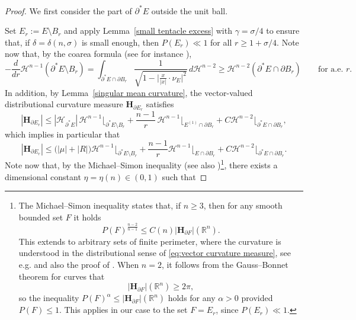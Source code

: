 \documentclass[reqno,11pt]{amsart}
\newcommand{\R}{\mathbb R}
\numberwithin{equation}{section}
\theoremstyle{remark}
\begin{document}
\begin{proof}
We first consider the part of $\partial^*E$ outside the unit ball.   


Set $E_r:=E\setminus B_{r}$ and apply Lemma~\ref{small tentacle excess} with $\gamma=\sigma/4$ to ensure that, if $\delta=\delta(n,\sigma)$ is small enough, then
$P(E_r)\ll 1$ for all $r \geq 1+\sigma/4$.
Note now that, by the coarea formula (see for instance \cite[Theorem 18.8]{M2012}),
\begin{equation}
\label{eq:coarea angle}
-\frac{d}{dr}\mathscr H^{n-1}\left(\partial^*E \setminus B_{r}\right)= \int_{\partial^*E\cap \partial B_{r}}\frac{1}{\sqrt{1-\big|\frac{x}{|x|}\cdot \nu_E\big|^2}}\,d\mathscr H^{n-2} \geq  \mathscr H^{n-2}(\partial^*E\cap \partial B_{r})
\qquad \text{for a.e. }r.
\end{equation}
In addition, by Lemma~\ref{singular mean curvature}, the vector-valued
distributional curvature measure $\mathbf H_{\partial E_r}$ satisfies
$$|\mathbf H_{\partial E_r}|\le |\mathcal H_{\partial^*E}|\, \mathscr H^{n-1}\lfloor_{\partial^*E\setminus B_r}+\frac{n-1}{r}\,\mathscr H^{n-1}\lfloor_{E^{(1)}\cap\partial B_r}+ C \mathscr H^{n-2}\lfloor_{\partial^*E\cap \partial B_{r}},$$
which implies in particular that
\begin{equation}
\label{eq:H Er}
|\mathbf H_{\partial E_r}|\leq \big(|\mu|+|R|\big)\mathscr H^{n-1}\lfloor_{\partial^*E\setminus B_{r}}+\frac{n-1}{r}\mathscr H^{n-1}\lfloor_{E\cap \partial B_{r}}+C \mathscr H^{n-2}\lfloor_{\partial^*E\cap \partial B_{r}}.
\end{equation}
Note now that, by the Michael--Simon inequality \cite{MS1973} (see also \cite{A1972})\footnote{The Michael--Simon inequality states that, if $n \geq 3$, then for any smooth bounded set $F$ it holds
\begin{equation*}
P(F)^{\frac{n-2}{n-1}}\leq C(n) |\mathbf H_{\partial F}|(\R^n).
\end{equation*}
This extends to arbitrary sets of finite perimeter, where the curvature is understood in the distributional sense of \eqref{eq:vector curvature measure}, see e.g. \cite[Theorem 5.7]{S2014}  and also the proof of \cite[Theorem 1.2]{CM2022}.
When $n=2$, it follows from the Gauss--Bonnet theorem for curves that
$$
|\mathbf H_{\partial F}|(\R^n)\geq 2\pi,
$$
so the inequality $P(F)^{\alpha}\leq  |\mathbf H_{\partial F}|(\R^n)$ holds for any $\alpha>0$ provided $P(F)\leq 1$. This applies in our case to the set $F=E_r$, since $P(E_r)\ll 1$. }, there exists a dimensional constant $\eta=\eta(n)\in (0,1)$ such that

\end{proof}
\end{document}

